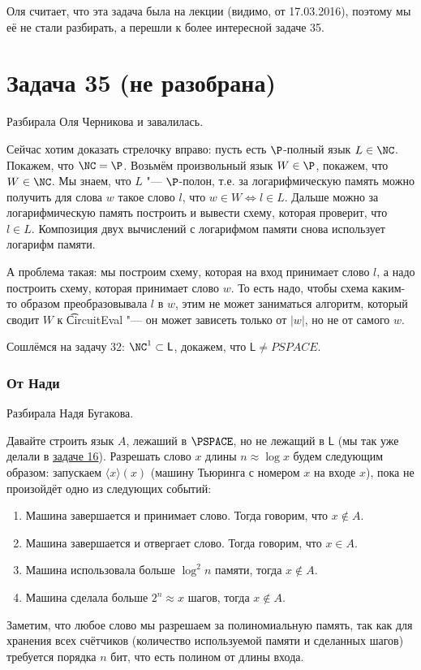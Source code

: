 	Оля считает, что эта задача была на лекции (видимо, от 17.03.2016),
	поэтому мы её не стали разбирать, а перешли к более интересной задаче 35.

	\TODO

\section{Задача 35 (не разобрана)}
	Разбирала Оля Черникова и завалилась.

	Сейчас хотим доказать стрелочку вправо: пусть есть $\P$-полный язык $L \in \NC$.
	Покажем, что $\NC=\P$.
	Возьмём произвольный язык $W \in \P$, покажем, что $W \in \NC$.
	Мы знаем, что $L$ "--- $\P$-полон, т.е. за логарифмическую память можно
	получить для слова $w$ такое слово $l$, что $w \in W \iff l \in L$.
	Дальше можно за логарифмическую память построить и вывести схему, которая проверит, что
	$l \in L$.
	Композиция двух вычислений с логарифмом памяти снова использует логарифм памяти.

	А проблема такая: мы построим схему, которая на вход принимает слово $l$, а надо
	построить схему, которая принимает слово $w$.
	То есть надо, чтобы схема каким-то образом преобразовывала $l$ в $w$, этим не может заниматься
	алгоритм, который сводит $W$ к \t{CircuitEval} "--- он может зависеть только от $|w|$, но не
	от самого $w$.

	Сошлёмся на задачу 32: $\NC^1 \subset \mathsf{L}$, докажем, что $\mathsf{L} \neq PSPACE$.
	\subsubsection{От Нади}
		Разбирала Надя Бугакова.

		Давайте строить язык $A$, лежаший в $\PSPACE$, но не лежащий в $\mathsf{L}$ (мы так уже делали в \hyperref[prob16]{задаче 16}).
		Разрешать слово $x$ длины $n \approx \log x$ будем следующим образом: запускаем $\langle x \rangle(x)$
		(машину Тьюринга с номером $x$ на входе $x$), пока не произойдёт одно из следующих событий:
		\begin{enumerate}
			\item Машина завершается и принимает слово. Тогда говорим, что $x \notin A$.
			\item Машина завершается и отвергает слово. Тогда говорим, что $x \in A$.
			\item Машина использовала больше $\log^2 n$ памяти, тогда $x \notin A$.
			\item Машина сделала больше $2^n \approx x$ шагов, тогда $x \notin A$.
		\end{enumerate}
		Заметим, что любое слово мы разрешаем за полиномиальную память, так как для хранения
		всех счётчиков (количество используемой памяти и сделанных шагов) требуется порядка
		$n$ бит, что есть полином от длины входа.
		
